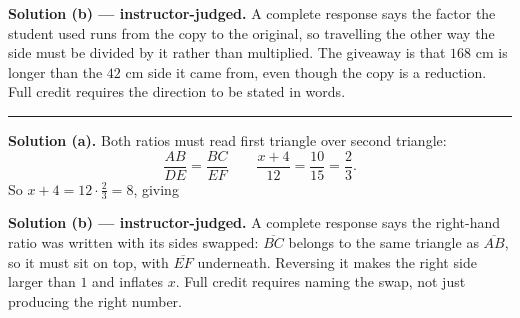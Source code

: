 \documentclass[12pt]{article}
\begin{document}
\noindent\textbf{Solution (b) --- instructor-judged.} A complete response says
the factor the student used runs from the copy to the original, so travelling
the other way the side must be divided by it rather than multiplied. The
giveaway is that $168$ cm is longer than the $42$ cm side it came from, even
though the copy is a reduction. Full credit requires the direction to be stated
in words.

\vspace{0.2cm}\noindent\rule{\linewidth}{0.2pt}


\noindent\textbf{Solution (a).} Both ratios must read first triangle over second
triangle:
\[ \frac{AB}{DE} = \frac{BC}{EF} \qquad \frac{x+4}{12} = \frac{10}{15} = \frac{2}{3}. \]
So $x + 4 = 12 \cdot \frac{2}{3} = 8$, giving 

\noindent\textbf{Solution (b) --- instructor-judged.} A complete response says
the right-hand ratio was written with its sides swapped: $\overline{BC}$ belongs
to the same triangle as $\overline{AB}$, so it must sit on top, with
$\overline{EF}$ underneath. Reversing it makes the right side larger than $1$
and inflates $x$. Full credit requires naming the swap, not just producing the
right number.
\end{document}
